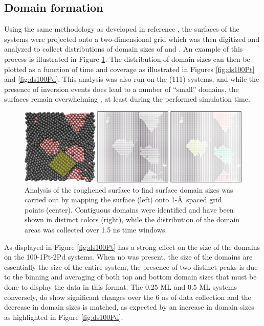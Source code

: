\subsection{Domain formation}
Using the same methodology as developed in reference \citep{Michalka:2015aa},
the surfaces of the systems were projected onto a two-dimensional grid which
was then digitized and analyzed to collect distributions of domain sizes of
 and . An example of this process is illustrated in Figure
\ref{fig:surfaceGrid}. 
The distribution of domain sizes can then be plotted as a
function of time and  coverage as illustrated in Figures
\ref{fig:ds100Pt} and \ref{fig:ds100Pd}. This analysis was also run on the
(111) systems, and while the presence of inversion events does lead to a number
of ``small''  domains, the surfaces remain overwhelming , at
least during the performed simulation time.

\begin{landscape}
\begin{figure}[p!]
\centering
  \includegraphics[width=\linewidth]{../figures/appC/grid_small.pdf}
  \caption{Analysis of the roughened surface to find surface domain sizes was
carried out by mapping the surface (left) onto 1-\AA\ spaced grid
points (center). Contiguous domains were identified and have been shown in
distinct colors (right), while the distribution of the domain areas was collected
over 1.5 ns time windows.}
\label{fig:surfaceGrid}
\end{figure}
\end{landscape}

As displayed in Figure \ref{fig:ds100Pt}  has a strong effect on the
size of the  domains on the 100-1Pt-2Pd systems. When no  was
present, the size of the domains are essentially the size of the entire system,
the presence of two distinct peaks is due to the binning and averaging of both
top and bottom domain sizes that must be done to display the data in this
format. The 0.25 ML and 0.5 ML systems conversely, do show significant changes
over the 6 ns of data collection and the decrease in  domain sizes is
matched, as expected by an increase in  domain sizes as highlighted in
Figure \ref{fig:ds100Pd}. 

